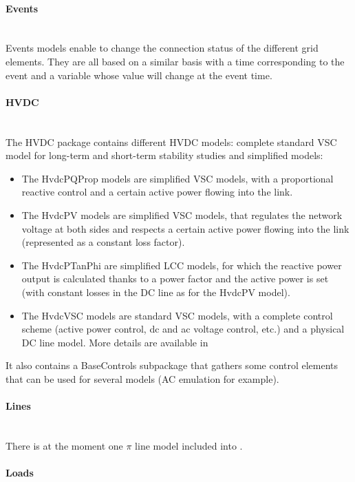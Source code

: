 \documentclass[a4paper, 12pt]{report}
\begin{document}
\paragraph{Events}
~~\\

Events models enable to change the connection status of the different grid elements. They are all based on a similar basis with a time corresponding to the event and a variable whose value will change at the event time.

\paragraph{HVDC}
~~\\

The HVDC package contains different HVDC models: complete standard VSC model for long-term and short-term stability studies and simplified models:
\begin{itemize}
\item The HvdcPQProp models are simplified VSC models, with a proportional reactive control and a certain active power flowing into the link.
\item The HvdcPV models are simplified VSC models, that regulates the network voltage at both sides and respects a certain active power flowing into the link (represented as a constant loss factor).
\item The HvdcPTanPhi are simplified LCC models, for which the reactive power output is calculated thanks to a power factor and the active power is set (with constant losses in the DC line as for the HvdcPV model).
\item The HvdcVSC models are standard VSC models, with a complete control scheme (active power control, dc and ac voltage control, etc.) and a physical DC line model. More details are available in \cite{AverageHVDC}
\end{itemize}
It also contains a BaseControls subpackage that gathers some control elements that can be used for several models (AC emulation for example).

\paragraph{Lines}
~~\\

There is at the moment one $\pi$ line model included into \Dynawo.

\paragraph{Loads}
~~\\
\end{document}
